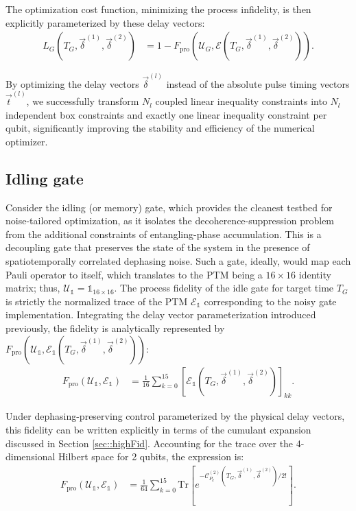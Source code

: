 \documentclass[%
 reprint,
superscriptaddress,
 amsmath,amssymb,
 aps,
pra,
floatfix,
]{revtex4-2}
\newcommand{\qk}[1]{{\color{OliveGreen}#1}}
\begin{document}
The optimization cost function, minimizing the process infidelity, is then explicitly parameterized by these delay vectors:
\begin{align}
    L_G(T_G, \vec{\delta}^{(1)}, \vec{\delta}^{(2)}) &= 1 - F_{\text{pro}}\left(\mathcal{U}_G, \mathcal{E}(T_G, \vec{\delta}^{(1)}, \vec{\delta}^{(2)})\right).
\end{align}

By optimizing the delay vectors $\vec{\delta}^{(l)}$ instead of the absolute pulse timing vectors $\vec{t}^{(l)}$, we successfully transform $N_l$ coupled linear inequality constraints into $N_l$ independent box constraints and exactly one linear inequality constraint per qubit, significantly improving the stability and efficiency of the numerical optimizer.

\subsection{Idling gate}
Consider the idling (or memory) gate, which \qk{provides the cleanest testbed for noise-tailored optimization, as it isolates the decoherence-suppression problem from the additional constraints of entangling-phase accumulation}.
This is a decoupling gate that preserves the state of the system in the presence of spatiotemporally correlated dephasing noise.
Such a gate, ideally, would map each Pauli operator to itself, which translates to the PTM being a $16 \times 16$ identity matrix; thus, $\mathcal{U}_\mathbb{1} = \mathbb{1}_{16\times 16}$.
The process fidelity of the idle gate for target time $T_G$ is strictly the normalized trace of the PTM $\mathcal{E}_\mathbb{1}$ corresponding to the noisy gate implementation.
Integrating the delay vector parameterization introduced previously, the fidelity is analytically represented by $F_{\text{pro}}\left(\mathcal{U}_\mathbb{1}, \mathcal{E}_\mathbb{1}(T_G, \vec{\delta}^{(1)}, \vec{\delta}^{(2)})\right)$:
\begin{align}
    F_{\text{pro}}\left(\mathcal{U}_\mathbb{1}, \mathcal{E}_\mathbb{1}\right) &= \frac{1}{16} \sum_{k=0}^{15} \left[\mathcal{E}_\mathbb{1}(T_G, \vec{\delta}^{(1)}, \vec{\delta}^{(2)})\right]_{kk}.
\end{align}

Under dephasing-preserving control parameterized by the physical delay vectors, this fidelity can be written explicitly in terms of the cumulant expansion discussed in Section \ref{sec::highFid}.
Accounting for the trace over the 4-dimensional Hilbert space for 2 qubits, the expression is:
\begin{align}
    F_{\text{pro}}(\mathcal{U}_\mathbb{1}, \mathcal{E}_\mathbb{1}) &= \frac{1}{64} \sum_{k=0}^{15} \text{Tr}\left[e^{-\mathcal{C}^{(2)}_{P_k}(T_G, \vec{\delta}^{(1)}, \vec{\delta}^{(2)})/2!}\right].
\end{align}
\end{document}
